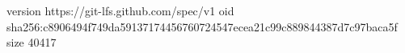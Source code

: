 version https://git-lfs.github.com/spec/v1
oid sha256:c8906494f749da59137174456760724547ecea21c99c889844387d7c97baca5f
size 40417
